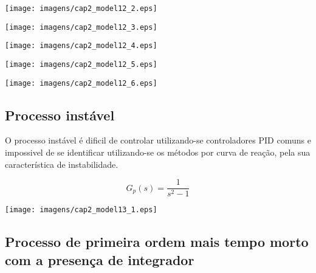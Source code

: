     \begin{center}
        \texttt{[image: imagens/cap2\_model12\_2.eps]}
    \end{center}
    
    \begin{center}
        \texttt{[image: imagens/cap2\_model12\_3.eps]}
    \end{center}
    
    \begin{center}
        \texttt{[image: imagens/cap2\_model12\_4.eps]}
    \end{center}
    
    \begin{center}
        \texttt{[image: imagens/cap2\_model12\_5.eps]}
    \end{center}
    
    \begin{center}
        \texttt{[image: imagens/cap2\_model12\_6.eps]}
    \end{center}

\subsection{Processo instável}
    
    O processo instável é dificil de controlar utilizando-se controladores \ac{PID}
    comuns e impossivel de se identificar utilizando-se os métodos por curva de
    reação, pela sua característica de instabilidade.
    
    \begin{equation}
        G_p(s) = \frac{1}{s^2 - 1}
    \end{equation}
    
    \begin{center}
        \texttt{[image: imagens/cap2\_model13\_1.eps]}
    \end{center}

\subsection{Processo de primeira ordem mais tempo morto com a presença de integrador}
    
